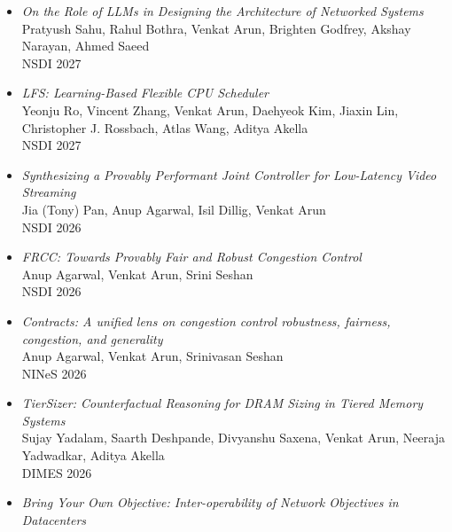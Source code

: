 \documentclass[notitlepage]{article}
\newcommand{\heading}[1]{\vspace{1em}{\large \MakeUppercase{\textrm{#1}}}

  \hrulefill
}
\begin{document}
\heading{Publications}

\begin{itemize}[noitemsep,nolistsep]
        \item {\it On the Role of LLMs in Designing the Architecture of Networked Systems}\label{paper:archie_full}\\
      Pratyush Sahu, Rahul Bothra, Venkat Arun, Brighten Godfrey, Akshay Narayan, Ahmed Saeed\\
      NSDI 2027\\
              \item {\it LFS: Learning-Based Flexible CPU Scheduler}\label{paper:lfs}\\
      Yeonju Ro, Vincent Zhang, Venkat Arun, Daehyeok Kim, Jiaxin Lin, Christopher J. Rossbach, Atlas Wang, Aditya Akella\\
      NSDI 2027\\
              \item {\it Synthesizing a Provably Performant Joint Controller for Low-Latency Video Streaming}\label{paper:syntra}\\
      Jia (Tony) Pan, Anup Agarwal, Isil Dillig, Venkat Arun\\
      NSDI 2026\\
              \item {\it FRCC: Towards Provably Fair and Robust Congestion Control}\label{paper:frcc}\\
      Anup Agarwal, Venkat Arun, Srini Seshan\\
      NSDI 2026\\
              \item {\it Contracts: A unified lens on congestion control robustness, fairness, congestion, and generality}\label{paper:contracts}\\
      Anup Agarwal, Venkat Arun, Srinivasan Seshan\\
      NINeS 2026\\
              \item {\it TierSizer: Counterfactual Reasoning for DRAM Sizing in Tiered Memory Systems}\label{paper:tiersizer}\\
      Sujay Yadalam, Saarth Deshpande, Divyanshu Saxena, Venkat Arun, Neeraja Yadwadkar, Aditya Akella\\
      DIMES 2026\\
              \item {\it Bring Your Own Objective: Inter-operability of Network Objectives in Datacenters}\label{paper:byoo}\\

\end{itemize}
\end{document}
